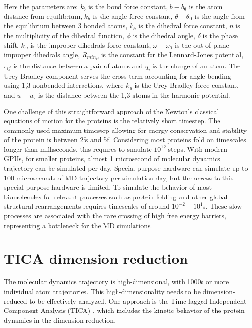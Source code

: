 Here the parameters are: $k_b$ is the bond force constant, $b-b_0$ is the atom distance from equilibrium, $k_\theta$ is the angle force constant, $\theta-\theta_0$ is the angle from the equilibrium between 3 bonded atoms, $k_\phi$ is the dihedral force constant, $n$ is the multiplicity of the dihedral function, $\phi$ is the dihedral angle, $\delta$ is the phase shift, $k_\omega$ is the improper dihedrals force constant, $\omega-\omega_0$ is the out of plane improper dihedrals angle, $R_{{min}_{ij}}$ is the constant for the Lennard-Jones potential, $r_{ij}$ is the distance between a pair of atoms and $q_{i}$ is the charge of an atom. The Urey-Bradley component serves the cross-term accounting for angle bending using 1,3 nonbonded interactions, where $k_{u}$ is the Urey-Bradley force constant, and $u-u_{0}$ is the distance between the 1,3 atoms in the harmonic potential.

One challenge of this straightforward approach of the Newton's classical equations of motion for the proteins is the relatively short timestep. The commonly used maximum timestep allowing for energy conservation and stability of the protein is between 2fs and 5f. Considering most proteins fold on timescales longer than milliseconds, this requires to simulate $10^{12}$ steps. With modern GPUs, for smaller proteins, almost 1 microsecond of molecular dynamics trajectory can be simulated per day. Special purpose hardware \cite{shaw2014anton} can simulate up to 100 microseconds of MD trajectory per simulation day, but the access to this special purpose hardware is limited. To simulate the behavior of most biomolecules for relevant processes such as protein folding and other global structural rearrangements requires timescales of around $10^{-2} - 10^{1}$s. These slow processes are associated with the rare crossing of high free energy barriers, representing a bottleneck for the MD simulations.

\section{TICA dimension reduction}

The molecular dynamics trajectory is high-dimensional, with 1000s or more individual atom trajectories. This high-dimensionality needs to be dimension-reduced to be effectively analyzed. One approach is the Time-lagged
Independent Component Analysis (TICA) \cite{TICA1-perez2013, TICA2-schwantes2013}, which includes the kinetic behavior of the protein dynamics in the dimension reduction.

